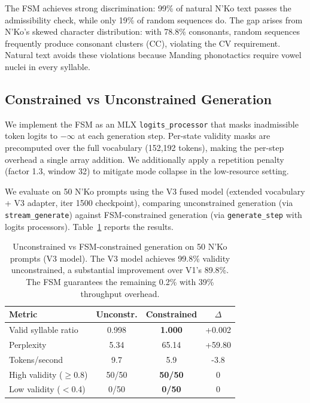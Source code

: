 \documentclass[11pt]{article}
\begin{document}
The FSM achieves strong discrimination: 99\% of natural N'Ko text passes the admissibility check, while only 19\% of random sequences do.
The gap arises from N'Ko's skewed character distribution: with 78.8\% consonants, random sequences frequently produce consonant clusters (CC), violating the CV requirement.
Natural text avoids these violations because Manding phonotactics require vowel nuclei in every syllable.

\subsection{Constrained vs Unconstrained Generation}

We implement the FSM as an MLX \texttt{logits\_processor} that masks inadmissible token logits to $-\infty$ at each generation step.
Per-state validity masks are precomputed over the full vocabulary (152,192 tokens), making the per-step overhead a single array addition.
We additionally apply a repetition penalty (factor 1.3, window 32) to mitigate mode collapse in the low-resource setting.

We evaluate on 50 N'Ko prompts using the V3 fused model (extended vocabulary + V3 adapter, iter 1500 checkpoint), comparing unconstrained generation (via \texttt{stream\_generate}) against FSM-constrained generation (via \texttt{generate\_step} with logits processors).
Table~\ref{tab:constrained-comparison} reports the results.

\begin{table}[t]
\centering
\small
\begin{tabular}{lccc}
\toprule
\textbf{Metric} & \textbf{Unconstr.} & \textbf{Constrained} & \textbf{$\Delta$} \\
\midrule
Valid syllable ratio & 0.998 & \textbf{1.000} & +0.002 \\
Perplexity & 5.34 & 65.14 & +59.80 \\
Tokens/second & 9.7 & 5.9 & -3.8 \\
High validity ($\geq$0.8) & 50/50 & \textbf{50/50} & 0 \\
Low validity ($<$0.4) & 0/50 & \textbf{0/50} & 0 \\
\bottomrule
\end{tabular}
\caption{Unconstrained vs FSM-constrained generation on 50 N'Ko prompts (V3 model).
The V3 model achieves 99.8\% validity unconstrained, a substantial improvement over V1's 89.8\%.
The FSM guarantees the remaining 0.2\% with 39\% throughput overhead.}
\label{tab:constrained-comparison}
\end{table}
\end{document}
